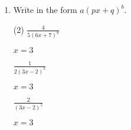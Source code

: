\begin{enumerate}[leftmargin=0cm]
\item Write in the form $a(px+q)^b$.
\begin{tasks}[label=(\alph*), after-item-skip=2pt,after-skip=3pt, label-width=4ex](2)
	\task  $ \frac{4}{5(6x+7)^8}                         $               \begin{envAnswer}[blankline=2]    $      x=3                     $ \end{envAnswer}
	\task  $ \frac{1}{2(3x-2)^5}                         $               \begin{envAnswer}[blankline=2]    $      x=3                     $ \end{envAnswer}
	\task  $ \frac{2}{(3x-2)^5}                         $               \begin{envAnswer}[blankline=2]    $      x=3                     $ \end{envAnswer}
\end{tasks}

\end{enumerate}

\clearpage


